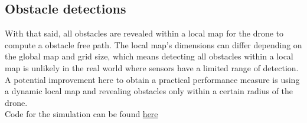 \subsection{Obstacle detections}
With that said, all obstacles are revealed within a local map for the drone to compute a obstacle free path. The local map's dimensions can differ depending on the global map and grid size, which means detecting all obstacles within a local map is unlikely in the real world where sensors have a limited range of detection. \\
 A potential improvement here to obtain a practical performance measure is using a dynamic local map and revealing obstacles only within a certain radius of the drone. \\

Code for the simulation can be found \href{https://github.com/s-desh/drone_path}{here}

